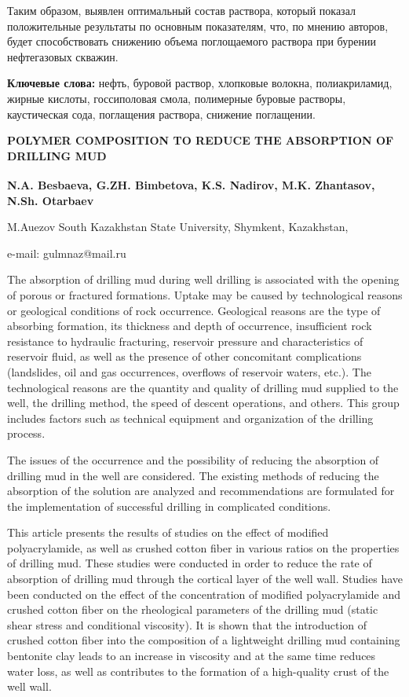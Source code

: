 Таким образом, выявлен оптимальный состав раствора, который показал
положительные результаты по основным показателям, что, по мнению
авторов, будет способствовать снижению объема поглощаемого раствора при
бурении нефтегазовых скважин.

{\bfseries Ключевые слова:} нефть, буровой раствор, хлопковые волокна,
полиакриламид, жирные кислоты, госсиполовая смола, полимерные буровые
растворы, каустическая сода, поглащения раствора, снижение поглащении.

\begin{articleheader}
{\bfseries POLYMER COMPOSITION TO REDUCE THE ABSORPTION OF DRILLING MUD}

{\bfseries
N.A. Besbaeva,
G.ZH. Bimbetova\textsuperscript{\envelope },
K.S. Nadirov,
M.K. Zhantasov,
N.Sh. Otarbaev
}
\end{articleheader}

\begin{affiliation}
M.Auezov South Kazakhstan State University, Shymkent, Kazakhstan,

e-mail: gulmnaz@mail.ru
\end{affiliation}

The absorption of drilling mud during well drilling is associated with
the opening of porous or fractured formations. Uptake may be caused by
technological reasons or geological conditions of rock occurrence.
Geological reasons are the type of absorbing formation, its thickness
and depth of occurrence, insufficient rock resistance to hydraulic
fracturing, reservoir pressure and characteristics of reservoir fluid,
as well as the presence of other concomitant complications (landslides,
oil and gas occurrences, overflows of reservoir waters, etc.). The
technological reasons are the quantity and quality of drilling mud
supplied to the well, the drilling method, the speed of descent
operations, and others. This group includes factors such as technical
equipment and organization of the drilling process.

The issues of the occurrence and the possibility of reducing the
absorption of drilling mud in the well are considered. The existing
methods of reducing the absorption of the solution are analyzed and
recommendations are formulated for the implementation of successful
drilling in complicated conditions.

This article presents the results of studies on the effect of modified
polyacrylamide, as well as crushed cotton fiber in various ratios on the
properties of drilling mud. These studies were conducted in order to
reduce the rate of absorption of drilling mud through the cortical layer
of the well wall. Studies have been conducted on the effect of the
concentration of modified polyacrylamide and crushed cotton fiber on the
rheological parameters of the drilling mud (static shear stress and
conditional viscosity). It is shown that the introduction of crushed
cotton fiber into the composition of a lightweight drilling mud
containing bentonite clay leads to an increase in viscosity and at the
same time reduces water loss, as well as contributes to the formation of
a high-quality crust of the well wall.

